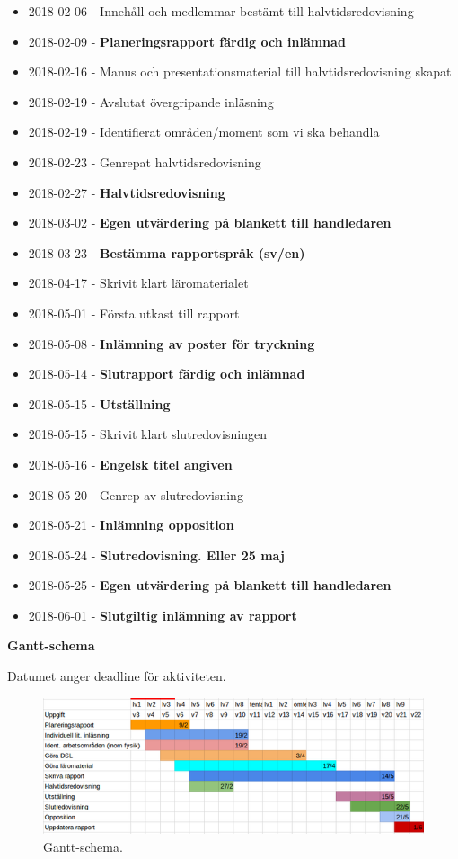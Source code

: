 \documentclass[12pt,a4paper]{article}
\begin{document}
\begin{itemize}
    \item 2018-02-06 - Innehåll och medlemmar bestämt till halvtidsredovisning
    \item 2018-02-09 - \textbf{Planeringsrapport färdig och inlämnad}
    \item 2018-02-16 - Manus och presentationsmaterial till halvtidsredovisning skapat
    \item 2018-02-19 - Avslutat övergripande inläsning
    \item 2018-02-19 - Identifierat områden/moment som vi ska behandla
    \item 2018-02-23 - Genrepat halvtidsredovisning
    \item 2018-02-27 - \textbf{Halvtidsredovisning}
    \item 2018-03-02 - \textbf{Egen utvärdering på blankett till handledaren}
    \item 2018-03-23 - \textbf{Bestämma rapportspråk (sv/en)}
    \item 2018-04-17 - Skrivit klart läromaterialet
    \item 2018-05-01 - Första utkast till rapport
    \item 2018-05-08 - \textbf{Inlämning av poster för tryckning}
    \item 2018-05-14 - \textbf{Slutrapport färdig och inlämnad}
    \item 2018-05-15 - \textbf{Utställning}
    \item 2018-05-15 - Skrivit klart slutredovisningen
    \item 2018-05-16 - \textbf{Engelsk titel angiven}
    \item 2018-05-20 - Genrep av slutredovisning
    \item 2018-05-21 - \textbf{Inlämning opposition}
    \item 2018-05-24 - \textbf{Slutredovisning. Eller 25 maj}
    \item 2018-05-25 - \textbf{Egen utvärdering på blankett till handledaren}
    \item 2018-06-01 - \textbf{Slutgiltig inlämning av rapport}
\end{itemize}

\textbf{Gantt-schema}

Datumet anger deadline för aktiviteten.

\begin{figure}[H]
  \includegraphics[width=\linewidth]{gantt.png}
  \caption{Gantt-schema.}
  \label{fig:gantt}
\end{figure}
\end{document}
